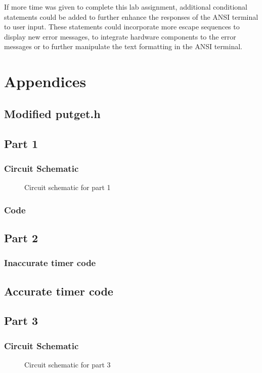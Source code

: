 \documentclass[12pt]{article}
\begin{document}
If more time was given to complete this lab assignment, additional conditional statements could be added to further enhance the responses of the ANSI terminal to user input. These statements could incorporate more escape sequences to display new error messages, to integrate hardware components to the error messages or to further manipulate the text formatting in the ANSI terminal. 


\pagebreak
\section{Appendices}
\subsection{Modified putget.h}
	
\subsection{Part 1}
	\subsubsection{Circuit Schematic}
		\begin{figure}[h]
			\caption{Circuit schematic for part 1}
			\label{schematic}
		\end{figure} 
	\subsubsection{Code}
		
\subsection{Part 2}
	\subsubsection{Inaccurate timer code}
		
	\subsection{Accurate timer code}
				

\subsection{Part 3}
	\subsubsection{Circuit Schematic}
		\begin{figure}[h]
			\caption{Circuit schematic for part 3}
			\label{schematic}
		\end{figure} 
	\pagebreak
\end{document}
